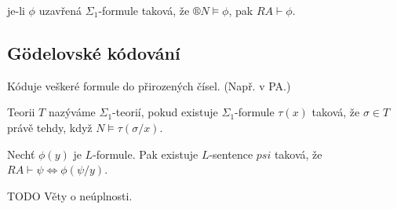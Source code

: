 \documentclass[12pt]{article}                   %
\begin{document}
    \begin{veta}
            je-li $\phi$ uzavřená $\Sigma_1$-formule taková, že $®N \models \phi$, pak $RA \vdash \phi$.
    \end{veta}

    \subsection{Gödelovské kódování}
        Kóduje veškeré formule do přirozených čísel. (Např. v PA.)

        \begin{definice}
            Teorii $T$ nazýváme $\Sigma_1$-teorií, pokud existuje $\Sigma_1$-formule $\tau(x)$ taková, že $\sigma \in T$ právě tehdy, když $N \models \tau(\sigma/x)$.
        \end{definice}

        \begin{veta}
            Nechť $\phi(y)$ je $L$-formule. Pak existuje $L$-sentence $psi$ taková, že $RA \vdash \psi \Leftrightarrow \phi(\psi/y)$.
        \end{veta}

        TODO Věty o neúplnosti.
\end{document}
